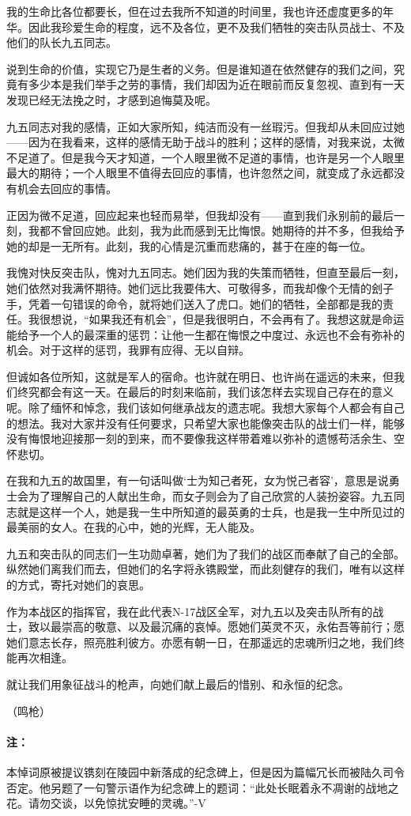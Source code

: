 我的生命比各位都要长，但在过去我所不知道的时间里，我也许还虚度更多的年华。因此我珍爱生命的程度，远不及各位，更不及我们牺牲的突击队员战士、不及他们的队长九五同志。

说到生命的价值，实现它乃是生者的义务。但是谁知道在依然健存的我们之间，究竟有多少本是我们举手之劳的事情，我们却因为近在眼前而反复忽视、直到有一天发现已经无法挽之时，才感到追悔莫及呢。

九五同志对我的感情，正如大家所知，纯洁而没有一丝瑕污。但我却从未回应过她——因为在我看来，这样的感情无助于战斗的胜利；这样的感情，对我来说，太微不足道了。但是我今天才知道，一个人眼里微不足道的事情，也许是另一个人眼里最大的期待；一个人眼里不值得去回应的事情，也许忽然之间，就变成了永远都没有机会去回应的事情。

正因为微不足道，回应起来也轻而易举，但我却没有——直到我们永别前的最后一刻，我都不曾回应她。此刻，我为此而感到无比悔恨。她期待的并不多，但我给予她的却是一无所有。此刻，我的心情是沉重而悲痛的，甚于在座的每一位。

我愧对快反突击队，愧对九五同志。她们因为我的失策而牺牲，但直至最后一刻，她们依然对我满怀期待。她们远比我要伟大、可敬得多，而我却像个无情的刽子手，凭着一句错误的命令，就将她们送入了虎口。她们的牺牲，全部都是我的责任。我很想说，“如果我还有机会”，但是我很明白，不会再有了。我想这就是命运能给予一个人的最深重的惩罚：让他一生都在悔恨之中度过、永远也不会有弥补的机会。对于这样的惩罚，我罪有应得、无以自辩。

但诚如各位所知，这就是军人的宿命。也许就在明日、也许尚在遥远的未来，但我们终究都会有这一天。在最后的时刻来临前，我们该怎样去实现自己存在的意义呢。除了缅怀和悼念，我们该如何继承战友的遗志呢。我想大家每个人都会有自己的想法。我对大家并没有任何要求，只希望大家也能像突击队的战士们一样，能够没有悔恨地迎接那一刻的到来，而不要像我这样带着难以弥补的遗憾苟活余生、空怀悲切。

在我和九五的故国里，有一句话叫做‘士为知己者死，女为悦己者容’，意思是说勇士会为了理解自己的人献出生命，而女子则会为了自己欣赏的人装扮姿容。九五同志就是这样一个人，她是我一生中所知道的最英勇的士兵，也是我一生中所见过的最美丽的女人。在我的心中，她的光辉，无人能及。

九五和突击队的同志们一生功勋卓著，她们为了我们的战区而奉献了自己的全部。纵然她们离我们而去，但她们的名字将永镌殿堂，而此刻健存的我们，唯有以这样的方式，寄托对她们的哀思。

作为本战区的指挥官，我在此代表N-17战区全军，对九五以及突击队所有的战士，致以最崇高的敬意、以及最沉痛的哀悼。愿她们英灵不灭，永佑吾等前行；愿她们意志长存，照亮胜利彼方。亦愿有朝一日，在那遥远的忠魂所归之地，我们终能再次相逢。

就让我们用象征战斗的枪声，向她们献上最后的惜别、和永恒的纪念。

（鸣枪）

\lineseparator

\paragraph*{注：}
本悼词原被提议镌刻在陵园中新落成的纪念碑上，但是因为篇幅冗长而被陆久司令否定。他另题了一句警示语作为纪念碑上的题词：“此处长眠着永不凋谢的战地之花。请勿交谈，以免惊扰安睡的灵魂。”-V
